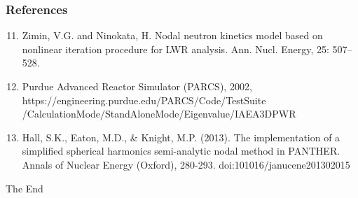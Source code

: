 \documentclass{beamer}
\begin{document}
\begin{frame}
\frametitle{References}
\begin{enumerate}
  \setcounter{enumi}{10}
  \item Zimin, V.G. and Ninokata, H. Nodal neutron kinetics model based on nonlinear iteration procedure for LWR analysis. Ann. Nucl. Energy, 25: 507–528.
  \item Purdue Advanced Reactor Simulator (PARCS), 2002, https://engineering.purdue.edu/PARCS/Code/TestSuite /CalculationMode/StandAloneMode/Eigenvalue/IAEA3DPWR
  \item Hall, S.K., Eaton, M.D., \& Knight, M.P. (2013). The implementation of a simplified spherical harmonics semi-analytic nodal method in PANTHER. Annals of Nuclear Energy (Oxford), 280-293. doi:101016/janucene201302015
\end{enumerate}
\end{frame}


\begin{frame}
\Huge{\centerline{The End}}
\end{frame}

\end{document}
